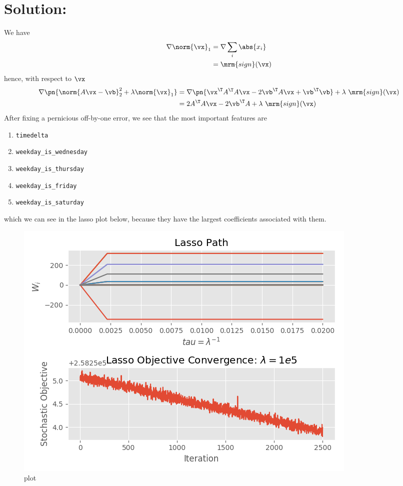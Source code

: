 \documentclass[189]{pset}
\begin{document}
  \hrulefill

  \section*{Solution:}
    We have
    \begin{align*}
      \nabla \norm{\vx}_1
      &= \nabla \sum_{i} \abs{x_i} \\
      &= \mrm{sign} (\vx)
    \end{align*}
    hence, with respect to $\vx$
    \begin{align*}
      \nabla \pn{\norm{A\vx - \vb}_2^2 + \lambda \norm{\vx}_1}
      &= \nabla \pn{\vx^\T A^\T A \vx - 2\vb^\T A \vx + \vb^\T \vb} +
        \lambda \ \mrm{sign}(\vx) \\
      &= 2 A^\T A \vx - 2\vb^\T A + \lambda\ \mrm{sign}(\vx)
    \end{align*}
    After fixing a pernicious off-by-one error, we see that the most
    important features are
    \begin{enumerate}[label=\arabic*.]
      \item \texttt{timedelta}
      \item \texttt{weekday\_is\_wednesday}
      \item \texttt{weekday\_is\_thursday}
      \item \texttt{weekday\_is\_friday}
      \item \texttt{weekday\_is\_saturday}
    \end{enumerate}
    which we can see in the lasso plot below, because they have the
    largest coefficients associated with them.
    \begin{figure}[H]
      \centering
      \includegraphics{hw7pr2_lasso.png}
      \caption{plot}
      \label{fig:w}
    \end{figure}
\end{document}
